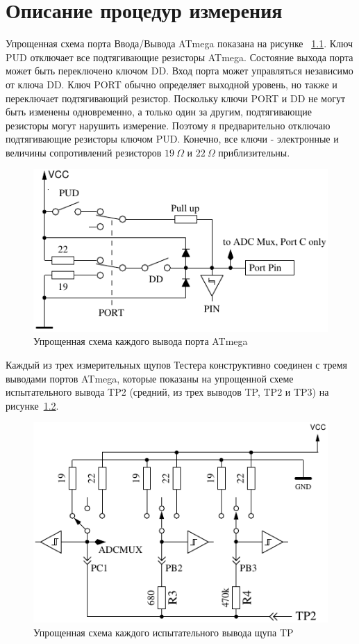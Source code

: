 \chapter{Описание процедур измерения}
\label{sec:measurement}
Упрощенная схема порта Ввода/Вывода ATmega показана  на рисунке ~\ref{fig:port}.
Ключ PUD отключает все подтягивающие резисторы ATmega. Состояние выхода порта может быть переключено ключом DD. 
Вход порта может управляться независимо от ключа DD. Ключ PORT обычно определяет выходной уровень, но также и 
переключает подтягивающий резистор. Поскольку ключи PORT и DD не могут быть изменены одновременно, а только один 
за другим, подтягивающие резисторы могут нарушить измерение. Поэтому я предварительно отключаю подтягивающие 
резисторы ключом PUD. Конечно, все ключи - электронные и величины сопротивлений резисторов \(19~\Omega\) 
и \(22~\Omega\) приблизительны.

\begin{figure}[H]
\centering
\includegraphics[width=.8\textwidth]{../FIG/port.pdf}
\caption{Упрощенная схема каждого вывода порта ATmega}
\label{fig:port}
\end{figure}

Каждый  из трех измерительных щупов Тестера конструктивно соединен с тремя выводами портов ATmega, которые показаны 
на упрощенной схеме испытательного вывода TP2 (средний, из трех выводов TP, TP2 и TP3) на рисунке~\ref{fig:terminal}.

\begin{figure}[H]
\centering
\includegraphics[width=.8\textwidth]{../FIG/terminal.pdf}
\caption{Упрощенная схема каждого испытательного вывода щупа TP}
\label{fig:terminal}
\end{figure}


